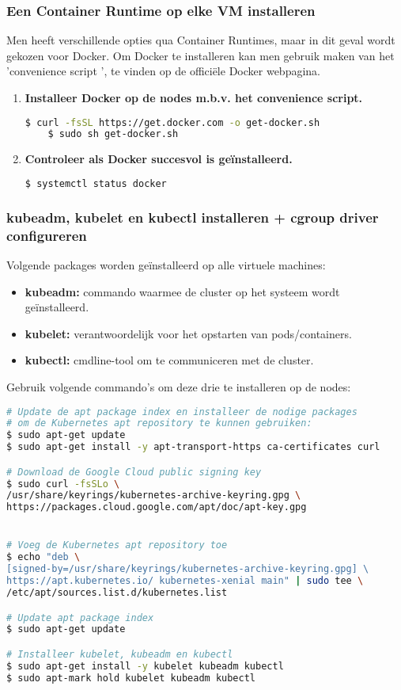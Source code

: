 \subsubsection{Een Container Runtime op elke VM installeren}

Men heeft verschillende opties qua Container Runtimes, maar in dit geval wordt gekozen voor Docker. Om Docker te installeren kan men gebruik maken van het 'convenience script ', te vinden op de officiële Docker webpagina. \autocite{Docker2021}
\begin{enumerate}
        \item {\bf Installeer Docker op de nodes m.b.v. het convenience script.}   
\begin{lstlisting}[language=bash]
    $ curl -fsSL https://get.docker.com -o get-docker.sh
    $ sudo sh get-docker.sh    
\end{lstlisting}
    
    \item {\bf Controleer als Docker succesvol is geïnstalleerd.}
\begin{lstlisting}[language=bash]  
    $ systemctl status docker
\end{lstlisting}
\end{enumerate}

\subsubsection{kubeadm, kubelet en kubectl installeren + cgroup driver configureren}

Volgende packages worden geïnstalleerd op alle virtuele machines:
\begin{itemize}
    \item {\bf kubeadm:} commando waarmee de cluster op het systeem wordt geïnstalleerd.
    \item {\bf kubelet:} verantwoordelijk voor het opstarten van pods/containers.
    \item {\bf kubectl:} cmdline-tool om te communiceren met de cluster.
\end{itemize}

Gebruik volgende commando's om deze drie te installeren op de nodes:
\begin{lstlisting}[language=bash]
# Update de apt package index en installeer de nodige packages 
# om de Kubernetes apt repository te kunnen gebruiken:
$ sudo apt-get update
$ sudo apt-get install -y apt-transport-https ca-certificates curl

# Download de Google Cloud public signing key
$ sudo curl -fsSLo \
/usr/share/keyrings/kubernetes-archive-keyring.gpg \ 
https://packages.cloud.google.com/apt/doc/apt-key.gpg


# Voeg de Kubernetes apt repository toe 
$ echo "deb \
[signed-by=/usr/share/keyrings/kubernetes-archive-keyring.gpg] \ 
https://apt.kubernetes.io/ kubernetes-xenial main" | sudo tee \
/etc/apt/sources.list.d/kubernetes.list

# Update apt package index 
$ sudo apt-get update

# Installeer kubelet, kubeadm en kubectl
$ sudo apt-get install -y kubelet kubeadm kubectl
$ sudo apt-mark hold kubelet kubeadm kubectl
\end{lstlisting}

